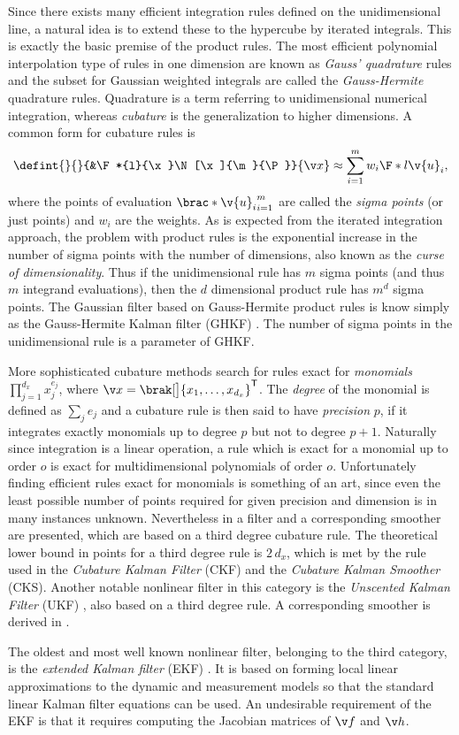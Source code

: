 Since there exists many efficient integration rules defined on the unidimensional line,
a natural idea is to extend these to the hypercube by iterated integrals. This is exactly the 
basic premise of the product rules. The most efficient polynomial interpolation type of rules
in one dimension are known as \emph{Gauss' quadrature} rules and the subset
for Gaussian weighted integrals are called the \emph{Gauss-Hermite}
quadrature rules. Quadrature is a term referring to unidimensional numerical integration, whereas
\emph{cubature} is the generalization to higher dimensions. A common form for cubature rules is
\begin{align}
	\defint{}{}{&\F*{l}{\x}\N[\x]{\m}{\P}}{\x} \approx \sum_{i=1}^m w_i\F*{l}{\v{u}_i},
\end{align}
where the points of evaluation $\brac*{\v{u}_i}_{i=1}^m$ are called the \emph{sigma points}
(or just points) and $w_i$ are the weights. As is expected from the iterated integration approach,
the problem with product rules is the exponential increase in the number of sigma points with
the number of dimensions, also known as the \emph{curse of dimensionality}. Thus if the unidimensional rule has $m$ sigma points (and thus $m$ integrand evaluations),
then the $d$ dimensional product rule has $m^d$ sigma points. The Gaussian filter based
on Gauss-Hermite product rules is know simply as the Gauss-Hermite Kalman filter (GHKF) \parencite{Ito2000}.
The number of sigma points in the unidimensional rule is a parameter of GHKF.

More sophisticated cubature methods search for rules
exact for \emph{monomials} $\prod_{j=1}^{d_x} x_j^{e_j}$, where $\x=\brak[\big]{x_1,\dots,x_{d_x}}^\tr$. 
The \emph{degree} of the monomial is defined as $\sum_j e_j$ and a cubature rule is then said to have
\emph{precision} $p$, if it integrates exactly monomials up to degree $p$ but not
to degree $p+1$. Naturally since integration is a linear operation, a rule which is exact 
for a monomial up to order $o$ is exact for multidimensional polynomials of order $o$.
Unfortunately finding efficient rules exact for monomials is something of an art, since
even the least possible number of points required for given precision and dimension is in many
instances unknown. Nevertheless in \textcite{Arasaratnam2009,Arasaratnam2011} a filter
and a corresponding smoother are presented, which are based on a third degree 
cubature rule. The theoretical lower bound in points for a third degree rule
is $2\,d_x$, which is met by the rule used in the \emph{Cubature Kalman Filter} (CKF) and
the \emph{Cubature Kalman Smoother} (CKS). Another notable nonlinear filter in this
category is the \emph{Unscented Kalman Filter} (UKF) \textcite{julier1997new,Merwe2004}, 
also based on a third degree rule. A corresponding smoother is derived in \textcite{Sarkka2008a}.

The oldest and most well known nonlinear filter, belonging to the third category, is
the \emph{extended Kalman filter} (EKF) \parencite{jazwinski2007stochastic}. 
It is based on forming local linear approximations to the dynamic
and measurement models so that the standard linear Kalman filter equations can be used.
An undesirable requirement of the EKF is that it requires computing
the Jacobian matrices of $\f$ and $\h$.

